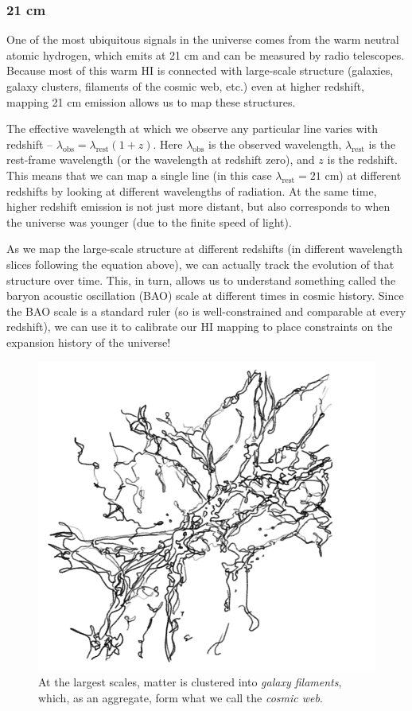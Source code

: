 \subsubsection{21 cm}

One of the most ubiquitous signals in the universe comes from the warm neutral atomic hydrogen, which emits at 21 cm and can be measured by radio telescopes. Because most of this warm HI is connected with large-scale structure (galaxies, galaxy clusters, filaments of the cosmic web, etc.) even at higher redshift, mapping 21 cm emission allows us to map these structures. 

The effective wavelength at which we observe any particular line varies with redshift -- $\lambda_\mathrm{obs} = \lambda_\mathrm{rest}(1 + z)$. Here $\lambda_\mathrm{obs}$ is the observed wavelength, $\lambda_\mathrm{rest}$ is the rest-frame wavelength (or the wavelength at redshift zero), and $z$ is the redshift. This means that we can map a single line (in this case $\lambda_\mathrm{rest} = 21$ cm) at different redshifts by looking at different wavelengths of radiation. At the same time, higher redshift emission is not just more distant, but also corresponds to when the universe was younger (due to the finite speed of light).

As we map the large-scale structure at different redshifts (in different wavelength slices following the equation above), we can actually track the evolution of that structure over time. This, in turn, allows us to understand something called the baryon acoustic oscillation (BAO) scale at different times in cosmic history. Since the BAO scale is a standard ruler (so is well-constrained and comparable at every redshift), we can use it to calibrate our HI mapping to place constraints on the expansion history of the universe!


\begin{figure}[h!]
    \centering
    \includegraphics[width=0.5\linewidth]{img/cosmicweb.png}
    \caption{At the largest scales, matter is clustered into \textit{galaxy filaments}, which, as an aggregate, form what we call the \textit{cosmic web}.}
    \label{fig:cosmicweb}
\end{figure}


